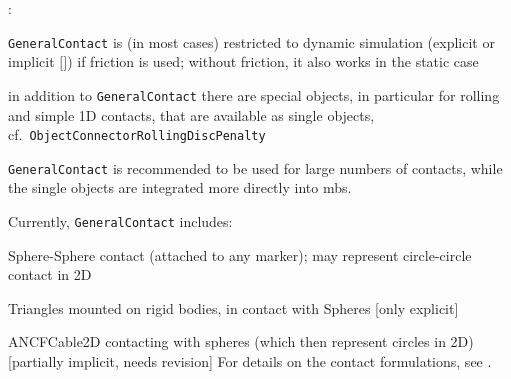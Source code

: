 
\noindent {}:
\bi
\item \texttt{GeneralContact} is (in most cases) restricted to dynamic simulation (explicit or implicit $[$$]$) if friction is used; without friction, it also works in the static case
\item in addition to \texttt{GeneralContact} there are special objects, in particular for rolling and simple 1D contacts, that are available as single objects, cf.\ \texttt{ObjectConnectorRollingDiscPenalty}
\item \texttt{GeneralContact} is recommended to be used for large numbers of contacts, while the single objects are integrated more directly into mbs.
\ei

\noindent Currently, \texttt{GeneralContact} includes:
\bi
  \item Sphere-Sphere contact (attached to any marker); may represent circle-circle contact in 2D
  \item Triangles mounted on rigid bodies, in contact with Spheres [only explicit]
  \item ANCFCable2D contacting with spheres (which then represent circles in 2D) [partially implicit, needs revision]
\ei
For details on the contact formulations, see .

